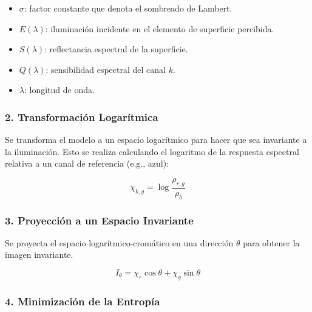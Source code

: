 \begin{itemize}
\setlength{\itemsep}{-1ex}
   \item{\begin{flushleft} $\sigma$: factor constante que denota el sombreado de Lambert. \end{flushleft}}
   \item{\begin{flushleft} $E(\lambda )$: iluminación incidente en el elemento de superficie percibida. \end{flushleft}}
   \item{\begin{flushleft} $S(\lambda )$: reflectancia espectral de la superficie. \end{flushleft}}
   \item{\begin{flushleft} $Q(\lambda )$: sensibilidad espectral del canal $k$. \end{flushleft}}
   \item{\begin{flushleft} $\lambda$: longitud de onda. \end{flushleft}}
\end{itemize}

\subsubsection{2. Transformación Logarítmica}

Se transforma el modelo a un espacio logarítmico para hacer que sea invariante a la iluminación. Esto se realiza calculando el logaritmo de la respuesta espectral relativa a un canal de referencia (e.g., azul):

$$\chi_{k,g} =\log \frac{\rho_{r,g} }{\rho_b }$$

\subsubsection{3. Proyección a un Espacio Invariante}

Se proyecta el espacio logarítmico-cromático en una dirección $\theta$ para obtener la imagen invariante.

$$I_{\theta } =\chi_r \cos \theta +\chi_g \sin \theta$$

\subsubsection{4. Minimización de la Entropía}

